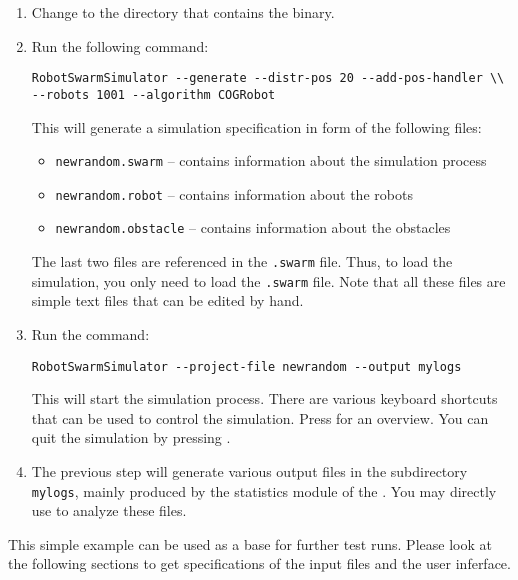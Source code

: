 \begin{enumerate}
	\item Change to the directory that contains the \RSS binary.
	\item Run the following command:

		\texttt{RobotSwarmSimulator -{}-generate -{}-distr-pos 20 -{}-add-pos-handler \textbackslash\textbackslash
			\linebreak -{}-robots 1001 -{}-algorithm COGRobot}

		This will generate a simulation specification in form of the following files:
		\begin{itemize}
			\item {\tt newrandom.swarm} -- contains information about the simulation process
			\item {\tt newrandom.robot} -- contains information about the robots
			\item {\tt newrandom.obstacle} -- contains information about the obstacles
		\end{itemize}
		The last two files are referenced in the {\tt .swarm} file. Thus, to load the simulation, you only need to load the {\tt .swarm} file. Note that all these files
are simple text files that can be edited by hand.
	\item Run the command:

		\centerline{\tt RobotSwarmSimulator -{}-project-file newrandom -{}-output mylogs}

		This will start the simulation process. There are various keyboard shortcuts that can be used to control the simulation. Press  for an overview. You can quit the simulation by pressing .
	\item The previous step will generate various output files in the subdirectory {\tt mylogs}, mainly produced by the statistics module of the \RSS. You may directly use \gnuplot to analyze these files.
\end{enumerate}
This simple example can be used as a base for further test runs. Please look at the following sections to get specifications of the input files and the user inferface.
